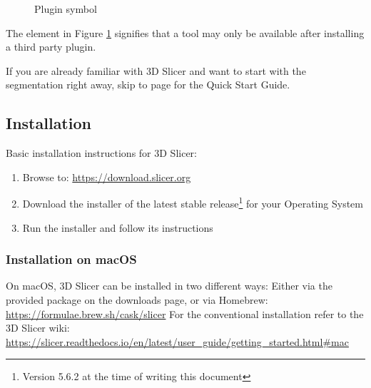 \begin{figure}[h!] %
	\centering
	
	\caption{Plugin symbol}\label{fig:plugin_icon}
\end{figure}
\noindent
The element in Figure \ref{fig:plugin_icon} signifies that a tool may only be available after installing a third party plugin.\newline

\noindent
If you are already familiar with 3D Slicer and want to start with the segmentation right away, skip to page \pageref{qsg} for the Quick Start Guide.

\subsection{Installation}
Basic installation instructions for 3D Slicer:
\begin{enumerate}
	\item Browse to: \url{https://download.slicer.org}
	\item Download the installer of the latest stable release\footnote{Version 5.6.2 at the time of writing this document} for your Operating System
	\item Run the installer and follow its instructions
\end{enumerate}

\subsubsection{Installation on macOS}
On macOS, 3D Slicer can be installed in two different ways:\newline\newline
Either via the provided package on the downloads page, or via Homebrew: \url{https://formulae.brew.sh/cask/slicer}\newline
For the conventional installation refer to the 3D Slicer wiki: \url{https://slicer.readthedocs.io/en/latest/user_guide/getting_started.html#mac}

